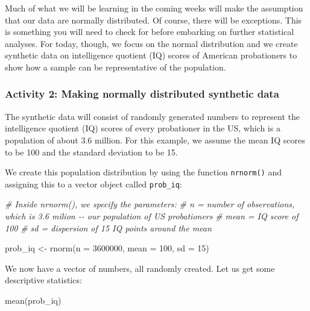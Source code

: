 \documentclass[
]{book}
\newenvironment{Shaded}{\begin{snugshade}}{\end{snugshade}}
\newcommand{\AttributeTok}[1]{\textcolor[rgb]{0.77,0.63,0.00}{#1}}
\newcommand{\CommentTok}[1]{\textcolor[rgb]{0.56,0.35,0.01}{\textit{#1}}}
\newcommand{\DecValTok}[1]{\textcolor[rgb]{0.00,0.00,0.81}{#1}}
\newcommand{\FunctionTok}[1]{\textcolor[rgb]{0.00,0.00,0.00}{#1}}
\newcommand{\NormalTok}[1]{#1}
\newcommand{\OtherTok}[1]{\textcolor[rgb]{0.56,0.35,0.01}{#1}}
\begin{document}
Much of what we will be learning in the coming weeks will make the assumption that our data are normally distributed. Of course, there will be exceptions. This is something you will need to check for before embarking on further statistical analyses. For today, though, we focus on the normal distribution and we create synthetic data on intelligence quotient (IQ) scores of American probationers to show how a sample can be representative of the population.

\hypertarget{activity-2-making-normally-distributed-synthetic-data}{%
\subsubsection{Activity 2: Making normally distributed synthetic data}\label{activity-2-making-normally-distributed-synthetic-data}}

The synthetic data will consist of randomly generated numbers to represent the intelligence quotient (IQ) scores of every probationer in the US, which is a population of about 3.6 million. For this example, we assume the mean IQ scores to be 100 and the standard deviation to be 15.

We create this population distribution by using the function \texttt{nrnorm()} and assigning this to a vector object called \texttt{prob\_iq}:

\begin{Shaded}
\begin{Highlighting}[]
\CommentTok{\# Inside nrnorm(), we specify the parameters:}
\CommentTok{\# n = number of observations, which is 3.6 milion {-}{-} our population of US probationers}
\CommentTok{\# mean = IQ score of 100}
\CommentTok{\# sd = dispersion of 15 IQ points around the mean}

\NormalTok{prob\_iq }\OtherTok{\textless{}{-}} \FunctionTok{rnorm}\NormalTok{(}\AttributeTok{n =} \DecValTok{3600000}\NormalTok{, }\AttributeTok{mean =} \DecValTok{100}\NormalTok{, }\AttributeTok{sd =} \DecValTok{15}\NormalTok{)}
\end{Highlighting}
\end{Shaded}

We now have a vector of numbers, all randomly created. Let us get some descriptive statistics:

\begin{Shaded}
\begin{Highlighting}[]
\FunctionTok{mean}\NormalTok{(prob\_iq) }
\end{Highlighting}
\end{Shaded}
\end{document}
